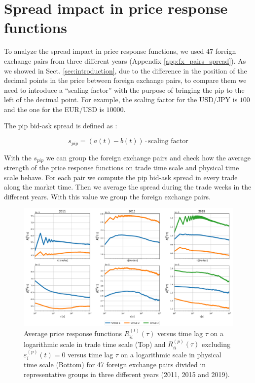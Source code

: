 \section{Spread impact in price response functions}\label{sec:spread_impact}

To analyze the spread impact in price response functions, we used 47 foreign
exchange pairs from three different years (Appendix \ref{app:fx_pairs_spread}).
As we showed in Sect. \ref{sec:introduction}, due to the difference in the
position of the decimal points in the price between foreign exchange pairs, to
compare them we need to introduce a ``scaling factor'' with the purpose of
bringing the pip to the left of the decimal point. For example, the scaling
factor for the USD/JPY is $100$ and the one for the EUR/USD is $10000$.

The pip bid-ask spread is defined as \cite{micro_eff}:

\begin{equation}
    s_{pip} = \left(a\left(t\right) - b\left(t\right)\right) \cdot
    \text{scaling factor}
\end{equation}

With the $s_{pip}$ we can group the foreign exchange pairs and check how the
average strength of the price response functions on trade time scale and
physical time scale behave. For each pair we compute the pip bid-ask spread in
every trade along the market time. Then we average the spread during the trade
weeks in the different years. With this value we group the foreign exchange
pairs.

\begin{figure}[htbp]
    \centering
    \includegraphics[width=\textwidth]{figures/05_spread_impact.png}
    \caption{Average price response functions
             $R^{\left(t\right)}_{ii}\left(\tau\right)$ versus time lag $\tau$
             on a logarithmic scale in trade time scale (Top) and
             $R^{\left(p\right)}_{ii}\left(\tau\right)$ excluding
             $\varepsilon^{\left(p\right)}_{i}\left(t\right) = 0$ versus time
             lag $\tau$ on a logarithmic scale in physical time scale (Bottom)
             for 47 foreign exchange pairs divided in representative groups in
             three different years (2011, 2015 and 2019).}
    \label{fig:spread_impact}
\end{figure}

